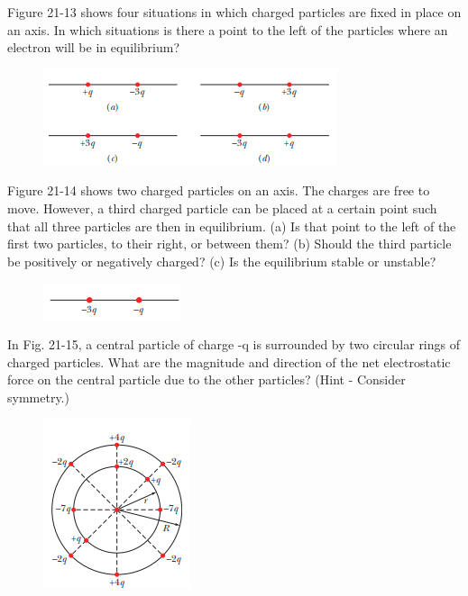 \documentclass[11pt]{exam}
\begin{document}
\begin{questions}
\addpoints
\question[10] Figure 21-13 shows four situations in which charged particles are fixed in place on an axis. In which situations is there a point to the left of the particles where an electron will be in equilibrium?\begin{figure}[H]
\centering
\includegraphics[scale=0.8]{assets/Halliday_ch21q3.png}
\end{figure}
\newpage

\addpoints
\question[10] Figure 21-14 shows two charged particles on an axis. The charges are free to move. However, a third charged particle can be placed at a certain point such that all three particles are then in equilibrium. (a) Is that point to the left of the first two particles, to their right, or between them? (b) Should the third particle be positively or negatively charged? (c)  Is the equilibrium stable or unstable?\begin{figure}[H]
\centering
\includegraphics[scale=0.8]{assets/Halliday_ch21q4.png}
\end{figure}
\newpage

\addpoints
\question[10] In Fig. 21-15, a central particle of charge -q is surrounded by two circular rings of charged particles. What are the magnitude and direction of the net electrostatic force on the central particle due to the other particles? (Hint - Consider symmetry.)\begin{figure}[H]
\centering
\includegraphics[scale=0.8]{assets/Halliday_ch21q5.png}
\end{figure}
\newpage


\end{questions}
\end{document}

